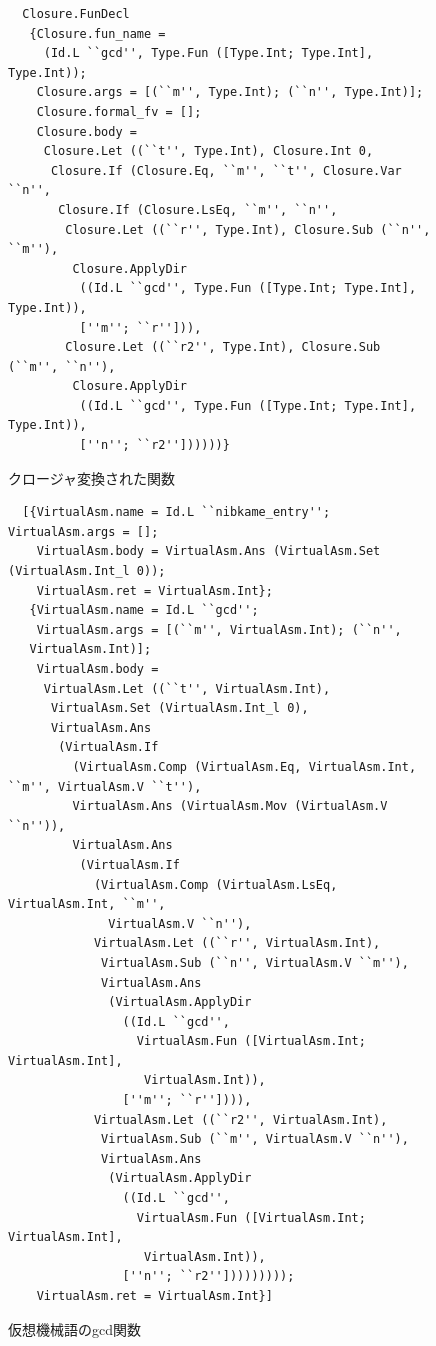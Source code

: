 \documentclass[a4paper,titlepage,report,disablejfam]{jsbook}
\begin{document}
\begin{figure}[htb]
\begin{center} 
\begin{lstlisting}
  Closure.FunDecl
   {Closure.fun_name =
     (Id.L ``gcd'', Type.Fun ([Type.Int; Type.Int], Type.Int));
    Closure.args = [(``m'', Type.Int); (``n'', Type.Int)];
    Closure.formal_fv = [];
    Closure.body =
     Closure.Let ((``t'', Type.Int), Closure.Int 0,
      Closure.If (Closure.Eq, ``m'', ``t'', Closure.Var ``n'',
       Closure.If (Closure.LsEq, ``m'', ``n'',
        Closure.Let ((``r'', Type.Int), Closure.Sub (``n'', ``m''),
         Closure.ApplyDir
          ((Id.L ``gcd'', Type.Fun ([Type.Int; Type.Int], Type.Int)),
          [''m''; ``r''])),
        Closure.Let ((``r2'', Type.Int), Closure.Sub (``m'', ``n''),
         Closure.ApplyDir
          ((Id.L ``gcd'', Type.Fun ([Type.Int; Type.Int], Type.Int)),
          [''n''; ``r2''])))))}
\end{lstlisting}
\caption{クロージャ変換された関数}\label{fig:impl-sample-closure}
\end{center}
\end{figure}

\begin{figure}[htb]
\begin{center}
\begin{lstlisting}
  [{VirtualAsm.name = Id.L ``nibkame_entry''; VirtualAsm.args = [];
    VirtualAsm.body = VirtualAsm.Ans (VirtualAsm.Set (VirtualAsm.Int_l 0));
    VirtualAsm.ret = VirtualAsm.Int};
   {VirtualAsm.name = Id.L ``gcd'';
    VirtualAsm.args = [(``m'', VirtualAsm.Int); (``n'',
   VirtualAsm.Int)];
    VirtualAsm.body =
     VirtualAsm.Let ((``t'', VirtualAsm.Int),
      VirtualAsm.Set (VirtualAsm.Int_l 0),
      VirtualAsm.Ans
       (VirtualAsm.If
         (VirtualAsm.Comp (VirtualAsm.Eq, VirtualAsm.Int, ``m'', VirtualAsm.V ``t''),
         VirtualAsm.Ans (VirtualAsm.Mov (VirtualAsm.V ``n'')),
         VirtualAsm.Ans
          (VirtualAsm.If
            (VirtualAsm.Comp (VirtualAsm.LsEq, VirtualAsm.Int, ``m'',
              VirtualAsm.V ``n''),
            VirtualAsm.Let ((``r'', VirtualAsm.Int),
             VirtualAsm.Sub (``n'', VirtualAsm.V ``m''),
             VirtualAsm.Ans
              (VirtualAsm.ApplyDir
                ((Id.L ``gcd'',
                  VirtualAsm.Fun ([VirtualAsm.Int; VirtualAsm.Int],
                   VirtualAsm.Int)),
                [''m''; ``r'']))),
            VirtualAsm.Let ((``r2'', VirtualAsm.Int),
             VirtualAsm.Sub (``m'', VirtualAsm.V ``n''),
             VirtualAsm.Ans
              (VirtualAsm.ApplyDir
                ((Id.L ``gcd'',
                  VirtualAsm.Fun ([VirtualAsm.Int; VirtualAsm.Int],
                   VirtualAsm.Int)),
                [''n''; ``r2'']))))))));
    VirtualAsm.ret = VirtualAsm.Int}]
  \end{lstlisting}
\caption{仮想機械語のgcd関数}\label{fig:impl-va-sample}
 \end{center}
\end{figure}
\end{document}
